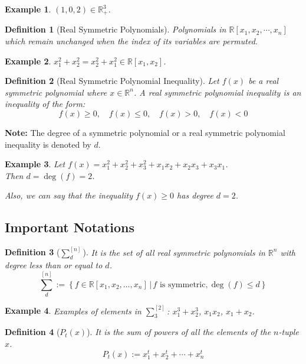 \documentclass[12pt]{article}
\newtheorem{definition}{Definition}
\newtheorem{example}{Example}
\theoremstyle{definition}
\begin{document}
\begin{example}
$(1, 0, 2) \in \mathbb{R}^3_+$.
\end{example}

\begin{definition}[Real Symmetric Polynomials]\label{def:RSP}
Polynomials in $\mathbb{R}[x_1, x_2, \cdots, x_n]$ which remain unchanged when the index of its variables are permuted.
\end{definition}

\begin{example}
$x_1^2 + x_2^2 = x_2^2 + x_1^2 \in \mathbb{R}[x_1, x_2]$.
\end{example}

\begin{definition}[Real Symmetric Polynomial Inequality]\label{def:RSPI}
Let $f(x)$ be a real symmetric polynomial where $x \in \mathbb{R}^n$. A real symmetric polynomial inequality is an inequality of the form:
\[
f(x) \geq 0, \quad f(x) \leq 0, \quad f(x) > 0, \quad f(x) < 0
\]
\end{definition}

\textbf{Note:} The degree of a symmetric polynomial or a real symmetric polynomial inequality is denoted by $d$.

\begin{example}
Let $f(x) = x_1^2 + x_2^2 + x_3^2 + x_1x_2 + x_2x_3 + x_3x_1$.\\
Then $d = \deg(f) = 2$.

Also, we can say that the inequality $f(x) \geq 0$ has degree $d = 2$.
\end{example}

\subsection{Important Notations}

\begin{definition}[$\sum_{d}^{[n]}$]\label{def:Sigma_d}
It is the set of all real symmetric polynomials in $\mathbb{R}^n$ with degree less than or equal to $d$.
\[
\sum_{d}^{[n]} := \left\{f \in \mathbb{R}[x_1, x_2, \ldots, x_n] \,\Big|\, f \text{ is symmetric}, \deg(f) \leq d\right\}
\]
\end{definition}

\begin{example}
Examples of elements in $\sum_{3}^{[2]}$: $x_1^3 + x_2^3$, $x_1x_2$, $x_1 + x_2$.
\end{example}

\begin{definition}[$P_t(x)$]\label{def:Pt}
It is the sum of powers of all the elements of the $n$-tuple $x$.
\[
P_t(x) := x_1^t + x_2^t + \cdots + x_n^t
\]
\end{definition}
\end{document}
